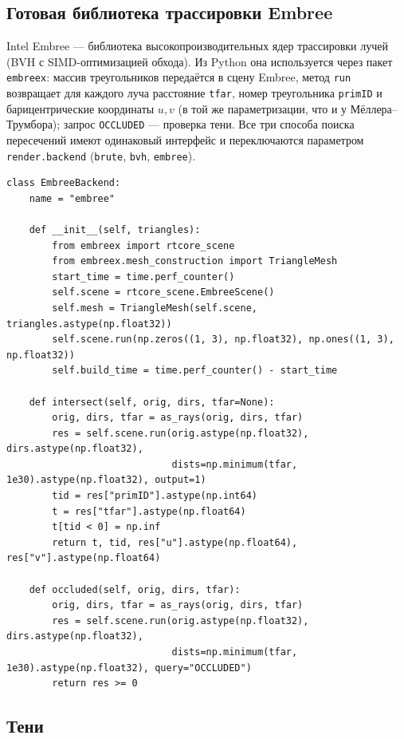 \documentclass[12pt,a4paper]{article}
\begin{document}
\subsection{Готовая библиотека трассировки Embree}

Intel Embree — библиотека высокопроизводительных ядер трассировки лучей (BVH с SIMD-оптимизацией обхода).
Из Python она используется через пакет \texttt{embreex}: массив треугольников передаётся в сцену Embree, метод
\texttt{run} возвращает для каждого луча расстояние \texttt{tfar}, номер треугольника \texttt{primID} и барицентрические
координаты $u, v$ (в той же параметризации, что и у Мёллера–Трумбора); запрос \texttt{OCCLUDED} — проверка тени.
Все три способа поиска пересечений имеют одинаковый интерфейс и переключаются параметром \texttt{render.backend}
(\texttt{brute}, \texttt{bvh}, \texttt{embree}).

\begin{lstlisting}
class EmbreeBackend:
    name = "embree"

    def __init__(self, triangles):
        from embreex import rtcore_scene
        from embreex.mesh_construction import TriangleMesh
        start_time = time.perf_counter()
        self.scene = rtcore_scene.EmbreeScene()
        self.mesh = TriangleMesh(self.scene, triangles.astype(np.float32))
        self.scene.run(np.zeros((1, 3), np.float32), np.ones((1, 3), np.float32))
        self.build_time = time.perf_counter() - start_time

    def intersect(self, orig, dirs, tfar=None):
        orig, dirs, tfar = as_rays(orig, dirs, tfar)
        res = self.scene.run(orig.astype(np.float32), dirs.astype(np.float32),
                             dists=np.minimum(tfar, 1e30).astype(np.float32), output=1)
        tid = res["primID"].astype(np.int64)
        t = res["tfar"].astype(np.float64)
        t[tid < 0] = np.inf
        return t, tid, res["u"].astype(np.float64), res["v"].astype(np.float64)

    def occluded(self, orig, dirs, tfar):
        orig, dirs, tfar = as_rays(orig, dirs, tfar)
        res = self.scene.run(orig.astype(np.float32), dirs.astype(np.float32),
                             dists=np.minimum(tfar, 1e30).astype(np.float32), query="OCCLUDED")
        return res >= 0
\end{lstlisting}

\subsection{Тени}
\end{document}
